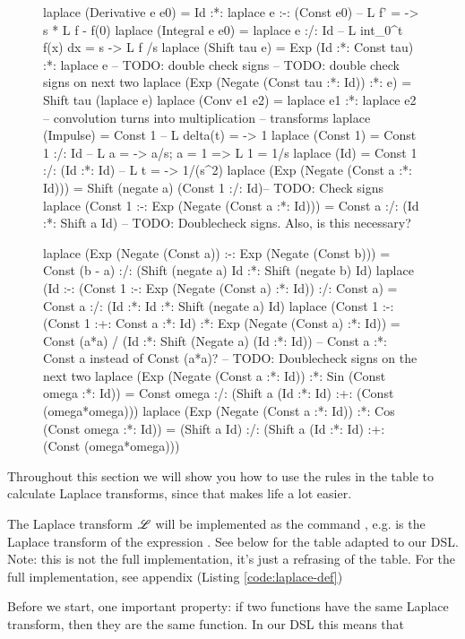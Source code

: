 \begin{table}
\begin{subfigure}{0.999\textwidth}
\begin{code'}
laplace (Derivative e e0) = Id :*: laplace e :-: (Const e0) -- L {f'} = \s -> s * L {f} - f(0)
laplace (Integral e e0) = laplace e :/: Id -- L {int_0^t f(x) dx} = s -> L {f} /s 
laplace (Shift tau e) = Exp (Id :*: Const tau) :*: laplace e -- TODO: double check signs
  -- TODO: double check signs on next two
laplace (Exp (Negate (Const tau :*: Id)) :*: e) = Shift tau (laplace e)
laplace (Conv e1 e2) = laplace e1 :*: laplace e2 -- convolution turns into multiplication
-- transforms
laplace (Impulse) = Const 1 -- L {delta(t)} = \s -> 1
laplace (Const 1) = Const 1 :/: Id -- L {a} = \s -> a/s; a = 1 => L {1} = 1/s
laplace (Id)      = Const 1 :/: (Id :*: Id) -- L {t} = \s -> 1/(s^2)
laplace (Exp (Negate (Const a :*: Id))) = Shift (negate a) (Const 1 :/: Id)-- TODO: Check signs
laplace (Const 1 :-: Exp (Negate (Const a :*: Id))) = Const a :/: (Id :*: Shift a Id) -- TODO: Doublecheck signs. Also, is this necessary?

laplace (Exp (Negate (Const a)) :-: Exp (Negate (Const b))) = 
  Const (b - a) :/: (Shift (negate a) Id :*: Shift (negate b) Id)
laplace (Id :-: (Const 1 :-: Exp (Negate (Const a) :*: Id)) :/: Const a) = 
  Const a  :/: (Id :*: Id :*: Shift (negate a) Id)
laplace (Const 1 :-: (Const 1 :+: Const a :*: Id) :*: Exp (Negate (Const a) :*: Id)) = 
  Const (a*a) / (Id :*: Shift (Negate a) (Id :*: Id)) -- Const a :*: Const a instead of Const (a*a)?
-- TODO: Doublecheck signs on the next two
laplace (Exp (Negate (Const a :*: Id)) :*: Sin (Const omega :*: Id)) = 
  Const omega :/: (Shift a (Id :*: Id) :+: (Const (omega*omega)))
laplace (Exp (Negate (Const a :*: Id)) :*: Cos (Const omega :*: Id)) = 
  (Shift a Id) :/: (Shift a (Id :*: Id) :+: (Const (omega*omega)))
    \end{code'}
\end{subfigure}
\end{table}
Throughout this section we will show you how to use the rules in the table to
calculate Laplace transforms, since that makes life a lot easier. 

The Laplace
transform $\mathscr{L}$ will be implemented as the command , e.g.
 is the Laplace transform of the expression .
See  below for the table adapted to our DSL. Note: this is not the
full implementation, it's just a refrasing of the table. For the full
implementation, see appendix (Listing
\ref{code:laplace-def})

Before we
start, one important property: if two
functions have the same Laplace transform, then they are the same function. In
our DSL this means that 


